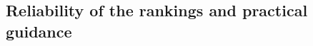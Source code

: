\subsection{Reliability of the rankings and practical guidance}
\label{sec:stability}
\label{sec:judge}
